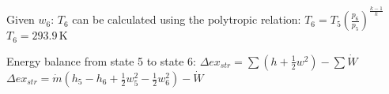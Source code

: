 Given \( w_6 \):  
\( T_6 \) can be calculated using the polytropic relation:  
\( T_6 = T_5 \left( \frac{p_6}{p_5} \right)^{\frac{k-1}{k}} \)  
\( T_6 = 293.9 \, \text{K} \)  

Energy balance from state 5 to state 6:  
\( \Delta ex_{str} = \sum \left( h + \frac{1}{2} w^2 \right) - \sum \dot{W} \)  
\( \Delta ex_{str} = \dot{m} \left( h_5 - h_6 + \frac{1}{2} w_5^2 - \frac{1}{2} w_6^2 \right) - \dot{W} \)